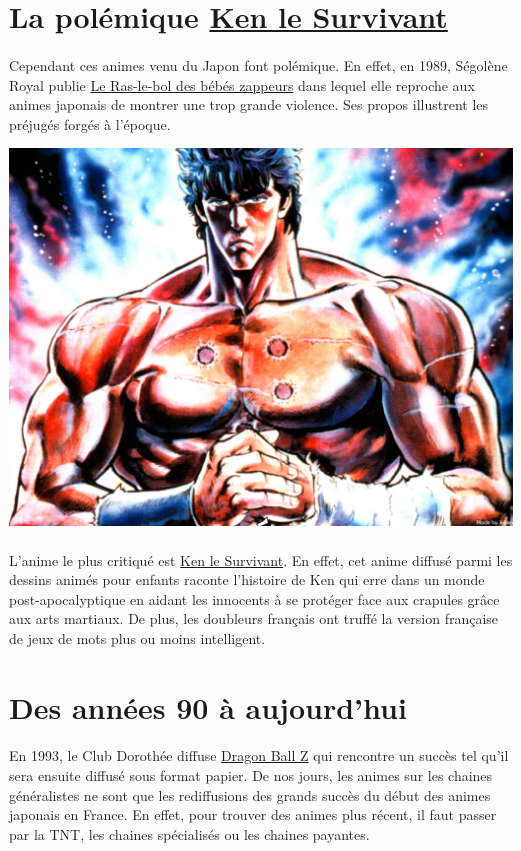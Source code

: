 \section{La polémique \underline{Ken le Survivant}}
\paragraph{}
Cependant ces animes venu du Japon font polémique. En effet, en 1989, Ségolène Royal publie \underline{Le Ras-le-bol des bébés zappeurs} dans lequel elle reproche aux animes japonais de montrer une trop grande violence. Ses propos illustrent les préjugés forgés à l’époque. 
\begin{center}
\includegraphics[scale=0.15]{ken.jpg}
\end{center}
\paragraph{}
L’anime le plus critiqué est \underline{Ken le Survivant}. En effet, cet anime diffusé parmi les dessins animés pour enfants raconte l’histoire de Ken qui erre dans un monde post-apocalyptique en aidant les innocents à se protéger face aux crapules grâce aux arts martiaux. De plus, les doubleurs français ont truffé la version française de jeux de mots plus ou moins intelligent.

\section{Des années 90 à aujourd'hui}
\paragraph{}
En 1993, le Club Dorothée diffuse \underline{Dragon Ball Z} qui rencontre un  succès tel qu’il sera ensuite diffusé sous format papier. De nos jours, les animes sur les chaines généralistes ne sont que les rediffusions des grands succès du début des animes japonais en France.  En effet, pour trouver des animes plus récent, il faut passer par la TNT, les chaines spécialisés ou les chaines payantes. 

